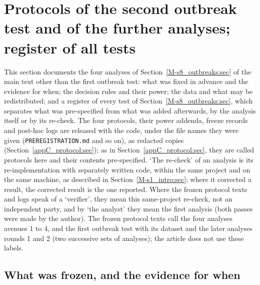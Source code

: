 \section{Protocols of the second outbreak test and of the further analyses; register of all tests}\label{appS_prot2:sec}

This section documents the four analyses of Section~\ref{M-s8_outbreaks:sec} of the main text other than the first
outbreak test: what was fixed in advance and the evidence for when; the decision rules and their
power; the data and what may be redistributed; and a register of every test of Section~\ref{M-s8_outbreaks:sec}, which separates what
was pre-specified from what was added afterwards, by the analysis itself or by its re-check. The four
protocols, their power addenda, freeze records and post-hoc logs are released with the code, under the file
names they were given (\texttt{PREREGISTRATION.md} and so on), as redacted copies (Section~\ref{appC_protocol:sec});
as in
Section~\ref{appC_protocol:sec}, they are called protocols here and their contents pre-specified. `The
re-check' of an analysis is its re-implementation with separately written code, within the same project and
on the same machine, as described in Section~\ref{M-s1_intro:sec}; where it corrected a result, the corrected result is the one reported.
Where the frozen protocol texts and logs speak of a `verifier', they mean this
same-project re-check, not an independent party, and by `the analyst' they mean the first analysis (both
passes were made by the author). The
frozen protocol texts call the four analyses avenues 1 to 4, and the first outbreak test with its dataset and the
later analyses rounds 1 and 2 (two successive sets of analyses); the article does not use these labels.

\subsection{What was frozen, and the evidence for when}\label{appS_prot2:sec:freeze}


